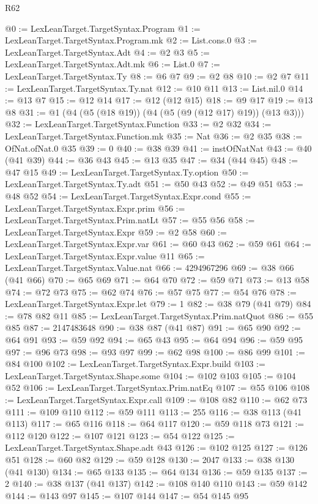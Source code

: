 \begin{lexlean}{R62}
\begin{coremodule}
@0 := LexLeanTarget.TargetSyntax.Program
@1 := LexLeanTarget.TargetSyntax.Program.mk
@2 := List.cons.{0}
@3 := LexLeanTarget.TargetSyntax.Adt
@4 := @2 @3
@5 := LexLeanTarget.TargetSyntax.Adt.mk
@6 := List.{0}
@7 := LexLeanTarget.TargetSyntax.Ty
@8 := @6 @7
@9 := @2 @8
@10 := @2 @7
@11 := LexLeanTarget.TargetSyntax.Ty.nat
@12 := @10 @11
@13 := List.nil.{0}
@14 := @13 @7
@15 := @12 @14
@17 := @12 (@12 @15)
@18 := @9 @17
@19 := @13 @8
@31 := @1 (@4 (@5 (@18 @19)) (@4 (@5 (@9 (@12 @17) @19)) (@13 @3)))
@32 := LexLeanTarget.TargetSyntax.Function
@33 := @2 @32
@34 := LexLeanTarget.TargetSyntax.Function.mk
@35 := Nat
@36 := @2 @35
@38 := OfNat.ofNat.{0} @35
@39 := 0
@40 := @38 @39
@41 := instOfNatNat
@43 := @40 (@41 @39)
@44 := @36 @43
@45 := @13 @35
@47 := @34 (@44 @45)
@48 := @47 @15
@49 := LexLeanTarget.TargetSyntax.Ty.option
@50 := LexLeanTarget.TargetSyntax.Ty.adt
@51 := @50 @43
@52 := @49 @51
@53 := @48 @52
@54 := LexLeanTarget.TargetSyntax.Expr.cond
@55 := LexLeanTarget.TargetSyntax.Expr.prim
@56 := LexLeanTarget.TargetSyntax.Prim.natLt
@57 := @55 @56
@58 := LexLeanTarget.TargetSyntax.Expr
@59 := @2 @58
@60 := LexLeanTarget.TargetSyntax.Expr.var
@61 := @60 @43
@62 := @59 @61
@64 := LexLeanTarget.TargetSyntax.Expr.value @11
@65 := LexLeanTarget.TargetSyntax.Value.nat
@66 := 4294967296
@69 := @38 @66 (@41 @66)
@70 := @65 @69
@71 := @64 @70
@72 := @59 @71
@73 := @13 @58
@74 := @72 @73
@75 := @62 @74
@76 := @57 @75
@77 := @54 @76
@78 := LexLeanTarget.TargetSyntax.Expr.let
@79 := 1
@82 := @38 @79 (@41 @79)
@84 := @78 @82 @11
@85 := LexLeanTarget.TargetSyntax.Prim.natQuot
@86 := @55 @85
@87 := 2147483648
@90 := @38 @87 (@41 @87)
@91 := @65 @90
@92 := @64 @91
@93 := @59 @92
@94 := @65 @43
@95 := @64 @94
@96 := @59 @95
@97 := @96 @73
@98 := @93 @97
@99 := @62 @98
@100 := @86 @99
@101 := @84 @100
@102 := LexLeanTarget.TargetSyntax.Expr.build
@103 := LexLeanTarget.TargetSyntax.Shape.some
@104 := @102 @103
@105 := @104 @52
@106 := LexLeanTarget.TargetSyntax.Prim.natEq
@107 := @55 @106
@108 := LexLeanTarget.TargetSyntax.Expr.call
@109 := @108 @82
@110 := @62 @73
@111 := @109 @110
@112 := @59 @111
@113 := 255
@116 := @38 @113 (@41 @113)
@117 := @65 @116
@118 := @64 @117
@120 := @59 @118 @73
@121 := @112 @120
@122 := @107 @121
@123 := @54 @122
@125 := LexLeanTarget.TargetSyntax.Shape.adt @43
@126 := @102 @125
@127 := @126 @51
@128 := @60 @82
@129 := @59 @128
@130 := 2047
@133 := @38 @130 (@41 @130)
@134 := @65 @133
@135 := @64 @134
@136 := @59 @135
@137 := 2
@140 := @38 @137 (@41 @137)
@142 := @108 @140 @110
@143 := @59 @142
@144 := @143 @97
@145 := @107 @144
@147 := @54 @145 @95

\end{coremodule}
\end{lexlean}
